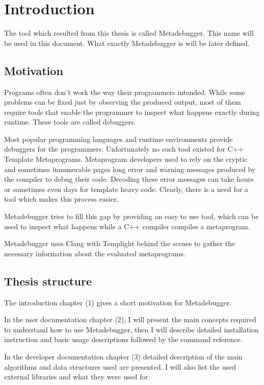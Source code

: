 
\chapter{Introduction}

The tool which resulted from this thesis is called Metadebugger. This name will
be used in this document. What exactly Metadebugger is will be later defined.

\section{Motivation}

Programs often don't work the way their programmers intended. While some
problems can be fixed just by observing the produced output, most of them
require tools that enable the programmer to inspect what happens exactly
during runtime. These tools are called debuggers.

Most popular programming languages and runtime environments provide debuggers
for the programmers. Unfortunately no such tool existed for C++\cite{cpp14}
Template Metaprograms. Metaprogram developers used to rely on the cryptic and
sometimes innumerable pages long error and warning messages produced by the
compiler to debug their code. Decoding these error messages can take hours or
sometimes even days for template heavy code.
\cite{sinkovics-phd}\cite{boost-spirit}
Clearly, there is a need for a tool which makes this process easier.

Metadebugger tries to fill this gap by providing an easy to use tool, which can
be used to inspect what happens while a C++ compiler compiles a metaprogram.

Metadebugger uses Clang with Templight behind the scenes to gather the
necessary information about the evaluated metaprograms.

\section{Thesis structure}

The introduction chapter (1) gives a short motivation for Metadebugger.

In the user documentation chapter (2), I will present the main concepts
required to understand how to use Metadebugger, then I will describe detailed
installation instruction and basic usage descriptions followed by the command
reference.

In the developer documentation chapter (3) detailed description of the main
algorithms and data structures used are presented. I will also list the used
external libraries and what they were used for.

